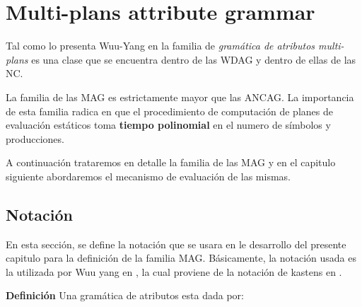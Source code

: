 \chapter{Multi-plans attribute grammar}
\label{chap:mag}
\minitoc

Tal como lo presenta Wuu-Yang en \cite{wuu-yang1} la familia de \textit{gramática de atributos multi-plans} es una clase que se encuentra dentro de las WDAG y dentro de ellas de las NC.

La familia de las MAG es estrictamente mayor que las ANCAG. La importancia de esta familia radica en que el procedimiento de computación de planes de evaluación estáticos toma \textbf{tiempo polinomial} en el numero de símbolos y producciones.

A continuación trataremos en detalle la familia de las MAG y en el capitulo siguiente abordaremos el mecanismo de evaluación de las mismas.


\section{Notación}
En esta sección, se define la notación que se usara en le desarrollo del presente capitulo para la definición de la familia MAG.
Básicamente, la notación usada es la utilizada por Wuu yang en \cite{wuu-yang1}, la cual proviene de la notación de kastens en \cite{kastens}.

\textbf{Definición} Una gramática de atributos esta dada por:

